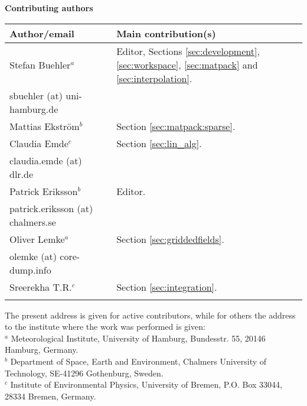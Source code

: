 \documentclass[11pt,twoside,a4paper,fleqn]{book}
\begin{document}
%
\newpage
\thispagestyle{plain}
%
\begin{center}
  {\Large \bf Contributing authors}
\end{center}
\vspace*{10mm}
\begin{tabular}{lp{10mm}l}
  \hline
  {\bf Author/email} & & {\bf Main contribution(s)} \\
  \hline
  Stefan Buehler$^a$ & & Editor, Sections \ref{sec:development}, \ref{sec:workspace},
  \ref{sec:matpack} and \ref{sec:interpolation}.\\
  sbuehler (at) uni-hamburg.de & &        \\
 \hline
  Mattias Ekstr\"om$^b$ & & Section \ref{sec:matpack:sparse}. \\
  \hline
  Claudia Emde$^c$ & & Section \ref{sec:lin_alg}.\\
  claudia.emde (at) dlr.de & & \\
  \hline
  Patrick Eriksson$^b$ &  & Editor. \\
  patrick.eriksson (at) chalmers.se & & \\
  \hline
  Oliver Lemke$^a$ & & Section \ref{sec:griddedfields}.\\
  olemke (at) core-dump.info & & \\
 \hline
  Sreerekha T.R.$^c$ & & Section \ref{sec:integration}.\\
  \hline
  &&\\
\end{tabular}

\noindent
The present address is given for active contributors, while for others
the address to the institute where the work was performed is given:\\
$^a$ Meteorological Institute, University of Hamburg, Bundesstr. 55,
20146 Hamburg, Germany.\\
$^b$ Department of Space, Earth and Environment, Chalmers University of Technology,
SE-41296 Gothenburg, Sweden. \\
$^c$ Institute of Environmental Physics, University of Bremen, P.O. Box 33044, 
28334 Bremen, Germany. \\


%
\newpage
\thispagestyle{empty}
\rule{0pt}{10pt}
\newpage
\end{document}
